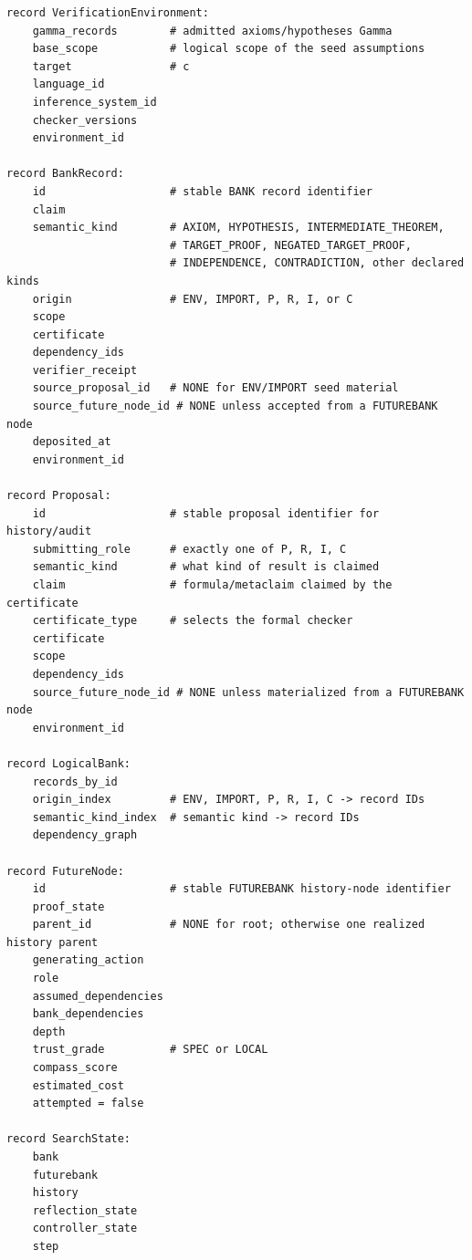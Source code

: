 \documentclass[11pt,openany]{book}
\theoremstyle{definition}
\theoremstyle{remark}
\begin{document}
\begin{lstlisting}[style=pseudo,caption={Core records and state}]
record VerificationEnvironment:
    gamma_records        # admitted axioms/hypotheses Gamma
    base_scope           # logical scope of the seed assumptions
    target               # c
    language_id
    inference_system_id
    checker_versions
    environment_id

record BankRecord:
    id                   # stable BANK record identifier
    claim
    semantic_kind        # AXIOM, HYPOTHESIS, INTERMEDIATE_THEOREM,
                         # TARGET_PROOF, NEGATED_TARGET_PROOF,
                         # INDEPENDENCE, CONTRADICTION, other declared kinds
    origin               # ENV, IMPORT, P, R, I, or C
    scope
    certificate
    dependency_ids
    verifier_receipt
    source_proposal_id   # NONE for ENV/IMPORT seed material
    source_future_node_id # NONE unless accepted from a FUTUREBANK node
    deposited_at
    environment_id

record Proposal:
    id                   # stable proposal identifier for history/audit
    submitting_role      # exactly one of P, R, I, C
    semantic_kind        # what kind of result is claimed
    claim                # formula/metaclaim claimed by the certificate
    certificate_type     # selects the formal checker
    certificate
    scope
    dependency_ids
    source_future_node_id # NONE unless materialized from a FUTUREBANK node
    environment_id

record LogicalBank:
    records_by_id
    origin_index         # ENV, IMPORT, P, R, I, C -> record IDs
    semantic_kind_index  # semantic kind -> record IDs
    dependency_graph

record FutureNode:
    id                   # stable FUTUREBANK history-node identifier
    proof_state
    parent_id            # NONE for root; otherwise one realized history parent
    generating_action
    role
    assumed_dependencies
    bank_dependencies
    depth
    trust_grade          # SPEC or LOCAL
    compass_score
    estimated_cost
    attempted = false

record SearchState:
    bank
    futurebank
    history
    reflection_state
    controller_state
    step
\end{lstlisting}
\end{document}
